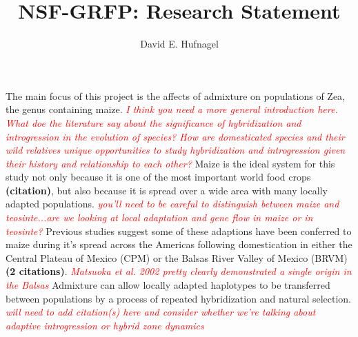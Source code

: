 \documentclass[12pt]{amsart}
\title{NSF-GRFP: Research Statement}
\author{David E. Hufnagel}
\newcommand{\mbh}[1]{\textcolor{red}{ \emph{\scriptsize  #1}} }
\begin{document}
\maketitle

The main focus of this project is the affects of admixture on populations of Zea, the genus containing maize.  \mbh{I think you need a more general introduction here.  What doe the literature say about the significance of hybridization and introgression in the evolution of species?  How are domesticated species and their wild relatives unique opportunities to study hybridization and introgression given their history and relationship to each other?}
Maize is the ideal system for this study not only because it is one of the most important world food crops \textbf{(citation)}, but also because it is spread over a wide area with many locally adapted populations.  \mbh{you'll need to be careful to distinguish between maize and teosinte...are we looking at local adaptation and gene flow in maize or in teosinte?}
Previous studies suggest some of these adaptions have been conferred to maize during it's spread across the Americas following domestication in either the Central Plateau of Mexico (CPM) or the Balsas River Valley of Mexico (BRVM) \textbf{(2 citations)}.  \mbh{Matsuoka \emph{et al.} 2002 pretty clearly demonstrated a single origin in the Balsas}
Admixture can allow locally adapted haplotypes to be transferred between populations by a process of repeated hybridization and natural selection. \mbh{will need to add citation(s) here and consider whether we're talking about adaptive introgression or hybrid zone dynamics}

\end{document}
